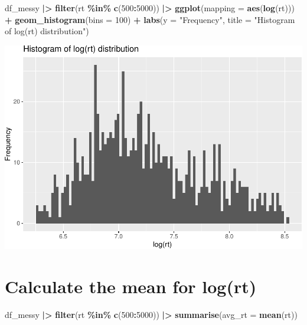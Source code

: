 \documentclass[
]{article}
\newenvironment{Shaded}{\begin{snugshade}}{\end{snugshade}}
\newcommand{\AttributeTok}[1]{\textcolor[rgb]{0.13,0.29,0.53}{#1}}
\newcommand{\DecValTok}[1]{\textcolor[rgb]{0.00,0.00,0.81}{#1}}
\newcommand{\FunctionTok}[1]{\textcolor[rgb]{0.13,0.29,0.53}{\textbf{#1}}}
\newcommand{\NormalTok}[1]{#1}
\newcommand{\SpecialCharTok}[1]{\textcolor[rgb]{0.81,0.36,0.00}{\textbf{#1}}}
\newcommand{\StringTok}[1]{\textcolor[rgb]{0.31,0.60,0.02}{#1}}
\begin{document}
\begin{Shaded}
\begin{Highlighting}[]
\NormalTok{df\_messy }\SpecialCharTok{|\textgreater{}}
  \FunctionTok{filter}\NormalTok{(rt }\SpecialCharTok{\%in\%} \FunctionTok{c}\NormalTok{(}\DecValTok{500}\SpecialCharTok{:}\DecValTok{5000}\NormalTok{)) }\SpecialCharTok{|\textgreater{}}
  \FunctionTok{ggplot}\NormalTok{(}\AttributeTok{mapping =} \FunctionTok{aes}\NormalTok{(}\FunctionTok{log}\NormalTok{(rt))) }\SpecialCharTok{+}
  \FunctionTok{geom\_histogram}\NormalTok{(}\AttributeTok{bins =} \DecValTok{100}\NormalTok{) }\SpecialCharTok{+} 
  \FunctionTok{labs}\NormalTok{(}\AttributeTok{y =} \StringTok{"Frequency"}\NormalTok{,}
       \AttributeTok{title =} \StringTok{"Histogram of log(rt) distribution"}\NormalTok{)}
\end{Highlighting}
\end{Shaded}

\includegraphics{L5_Checking_Assumptions_pdf_files/figure-latex/unnamed-chunk-14-1.pdf}

\hypertarget{calculate-the-mean-for-logrt}{%
\section{Calculate the mean for
log(rt)}\label{calculate-the-mean-for-logrt}}

\begin{Shaded}
\begin{Highlighting}[]
\NormalTok{df\_messy }\SpecialCharTok{|\textgreater{}}
  \FunctionTok{filter}\NormalTok{(rt }\SpecialCharTok{\%in\%} \FunctionTok{c}\NormalTok{(}\DecValTok{500}\SpecialCharTok{:}\DecValTok{5000}\NormalTok{)) }\SpecialCharTok{|\textgreater{}}
  \FunctionTok{summarise}\NormalTok{(}\AttributeTok{avg\_rt =} \FunctionTok{mean}\NormalTok{(rt))}
\end{Highlighting}
\end{Shaded}
\end{document}
